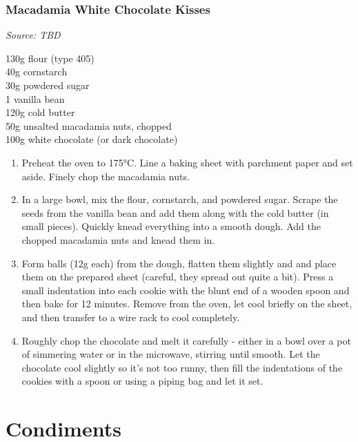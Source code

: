 \documentclass{report}
\begin{document}
\section{Macadamia White Chocolate Kisses}
\textit{Source: TBD}\\
\begin{minipage}[t]{0.21\textwidth} \vspace{0pt} \raggedright
130g flour (type 405)\\
40g cornstarch\\
30g powdered sugar\\
1 vanilla bean\\
120g cold butter\\
50g unsalted macadamia nuts, chopped\\
100g white chocolate (or dark chocolate)
\end{minipage}
\hfill
\begin{minipage}[t]{0.78\textwidth} \vspace{0pt}
	\begin{enumerate}
		\item Preheat the oven to 175°C. Line a baking sheet with parchment paper and set aside. Finely chop the macadamia nuts.
		\item In a large bowl, mix the flour, cornstarch, and powdered sugar. Scrape the seeds from the vanilla bean and add them along with the cold butter (in small pieces). Quickly knead everything into a smooth dough. Add the chopped macadamia nuts and knead them in. 
		\item Form balls (12g each) from the dough, flatten them slightly and and place them on the prepared sheet (careful, they spread out quite a bit). Press a small indentation into each cookie with the blunt end of a wooden spoon and then bake for 12 minutes. Remove from the oven, let cool briefly on the sheet, and then transfer to a wire rack to cool completely.
		\item Roughly chop the chocolate and melt it carefully - either in a bowl over a pot of simmering water or in the microwave, stirring until smooth. Let the chocolate cool slightly so it's not too runny, then fill the indentations of the cookies with a spoon or using a piping bag and let it set.
	\end{enumerate}	
\end{minipage}

\part{Condiments}
\end{document}
